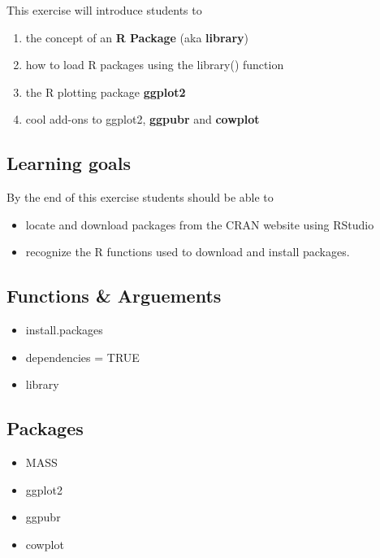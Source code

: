 \documentclass[]{book}
\providecommand{\tightlist}{%
  \setlength{\itemsep}{0pt}\setlength{\parskip}{0pt}}
\theoremstyle{definition}
\theoremstyle{definition}
\theoremstyle{definition}
\theoremstyle{remark}
\begin{document}
This exercise will introduce students to

\begin{enumerate}
\def\labelenumi{\arabic{enumi}.}
\tightlist
\item
  the concept of an \textbf{R Package} (aka \textbf{library})
\item
  how to load R packages using the library() function
\item
  the R plotting package \textbf{ggplot2}
\item
  cool add-ons to ggplot2, \textbf{ggpubr} and \textbf{cowplot}
\end{enumerate}

\subsection{Learning goals}\label{learning-goals}

By the end of this exercise students should be able to

\begin{itemize}
\tightlist
\item
  locate and download packages from the CRAN website using RStudio
\item
  recognize the R functions used to download and install packages.
\end{itemize}

\subsection{Functions \& Arguements}\label{functions-arguements}

\begin{itemize}
\tightlist
\item
  install.packages
\item
  dependencies = TRUE
\item
  library
\end{itemize}

\subsection{Packages}\label{packages}

\begin{itemize}
\tightlist
\item
  MASS
\item
  ggplot2
\item
  ggpubr
\item
  cowplot
\end{itemize}
\end{document}
